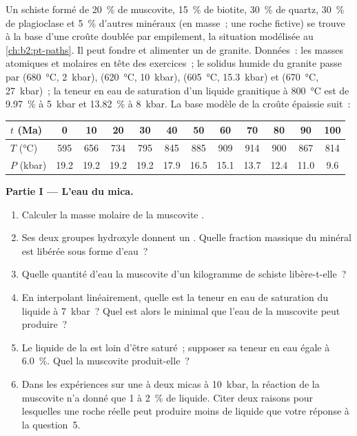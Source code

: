 \begin{problem}\label{pb:b2:crustal-melting:1}
Un schiste formé de \qty{20}{\percent} de muscovite, \qty{15}{\percent} de biotite,
\qty{30}{\percent} de quartz, \qty{30}{\percent} de plagioclase et \qty{5}{\percent} d'autres
minéraux (en masse~; une roche fictive) se trouve à la base d'une croûte doublée par empilement, la situation modélisée au
\cref{ch:b2:pt-paths}. Il peut fondre et alimenter un  de granite. Données~: les masses
atomiques et molaires en tête des exercices~; le solidus humide du granite passe par
(\qty{680}{\celsius}, \qty{2}{kbar}), (\qty{620}{\celsius}, \qty{10}{kbar}),
(\qty{605}{\celsius}, \qty{15.3}{kbar}) et (\qty{670}{\celsius}, \qty{27}{kbar})~; la teneur
en eau de saturation d'un liquide granitique à \qty{800}{\celsius} est de \qty{9.97}{\percent} à
\qty{5}{kbar} et \qty{13.82}{\percent} à \qty{8}{kbar}. La base modèle de la croûte épaissie suit~:

\smallskip
\begin{center}\small
\begin{tabular}{l|ccccccccccc}
$t$ (\unit{Ma}) & 0 & 10 & 20 & 30 & 40 & 50 & 60 & 70 & 80 & 90 & 100\\ \hline
$T$ (\unit{\celsius}) & 595 & 656 & 734 & 795 & 845 & 885 & 909 & 914 & 900 & 867 & 814\\
$P$ (\unit{kbar}) & 19.2 & 19.2 & 19.2 & 19.2 & 17.9 & 16.5 & 15.1 & 13.7 & 12.4 & 11.0 & 9.6
\end{tabular}
\end{center}
\smallskip

\noindent\textbf{Partie I --- L'eau du mica.}
\begin{enumerate}
\item Calculer la masse molaire de la muscovite .
\item Ses deux groupes hydroxyle donnent un . Quelle fraction massique du minéral est
libérée sous forme d'eau~?
\item Quelle quantité d'eau la muscovite d'un kilogramme de schiste libère-t-elle~?
\item En interpolant linéairement, quelle est la teneur en eau de saturation du liquide à
\qty{7}{kbar}~? Quel est alors le  minimal que l'eau de la muscovite peut produire~?
\item Le liquide de la  est loin d'être saturé~; supposer sa teneur en eau égale à
\qty{6.0}{\percent}. Quel  la muscovite produit-elle~?
\item Dans les expériences sur une  à deux micas à \qty{10}{kbar}, la réaction de la muscovite
n'a donné que 1 à \qty{2}{\percent} de liquide. Citer deux raisons pour lesquelles une roche réelle peut produire moins
de liquide que votre réponse à la question~5.
\end{enumerate}


\end{problem}
